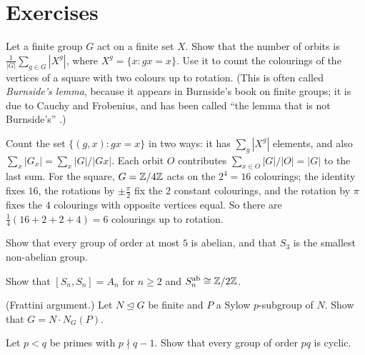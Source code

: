 \section{Exercises}\label{groups:section-exercises}

\begin{exercise}\label{groups:exercise-burnside-lemma}
Let a finite group $G$ act on a finite set $X$. Show that the number of orbits is
$\frac{1}{|G|}\sum_{g \in G} |X^g|$, where $X^g = \{x : gx = x\}$. Use it to count the colourings of the vertices of a square with two colours up to rotation.
(This is often called \emph{Burnside's lemma}, because it appears in Burnside's book on finite groups; it is due to Cauchy and Frobenius, and has been called ``the lemma that is not
Burnside's'' \cite{neumann-1979}.)
\end{exercise}

\begin{solution}
Count the set $\{(g, x) : gx = x\}$ in two ways: it has $\sum_g |X^g|$ elements, and
also $\sum_x |G_x| = \sum_x |G|/|Gx|$. Each orbit $O$ contributes
$\sum_{x \in O} |G|/|O| = |G|$ to the last sum. For the square, $G = \mathbb{Z}/4\mathbb{Z}$ acts on the $2^4 = 16$ colourings; the identity fixes $16$, the rotations by $\pm\frac\pi2$ fix the $2$ constant
colourings, and the rotation by $\pi$ fixes the $4$ colourings with opposite vertices equal. So there are $\frac14(16 + 2 + 2 + 4) = 6$ colourings up to rotation.
\end{solution}

\begin{exercise}\label{groups:exercise-small-orders}
Show that every group of order at most $5$ is abelian, and that $S_3$ is the smallest
non-abelian group.
\end{exercise}

\begin{exercise}\label{groups:exercise-abelianization-symmetric}
Show that $[S_n, S_n] = A_n$ for $n \geq 2$ and $S_n^{\mathrm{ab}} \cong \mathbb{Z}/2\mathbb{Z}$.
\end{exercise}

\begin{exercise}\label{groups:exercise-frattini}
(Frattini argument.) Let $N \trianglelefteq G$ be finite and $P$ a Sylow $p$-subgroup of $N$.
Show that $G = N \cdot N_G(P)$.
\end{exercise}

\begin{exercise}\label{groups:exercise-order-pq}
Let $p < q$ be primes with $p \nmid q - 1$. Show that every group of order $pq$ is cyclic.
\end{exercise}

